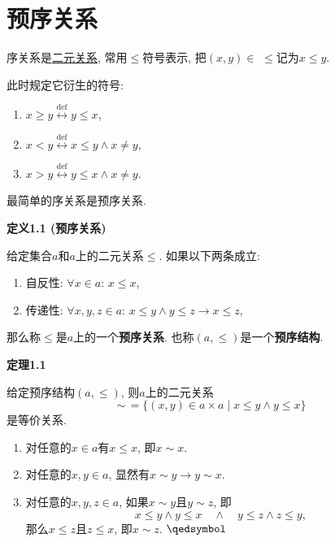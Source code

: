 \documentclass[UTF8]{ctexart}
\begin{document}
\setlength{\abovedisplayskip}{1pt}
\setlength{\belowdisplayskip}{1pt}

\section{预序关系}

序关系是\href{../../02 集合的一般构造/02 二元关系#nameddest=sec:定义1.1}{二元关系},
常用$\leqslant$符号表示, 把$(x,y)\in\,\,\leqslant$记为$x\leqslant y$.

此时规定它衍生的符号:
\begin{enumerate}
    \item $x\geqslant y\overset{\mathrm{def}}{\leftrightarrow}y\leqslant x$,
    \item $x<y\overset{\mathrm{def}}{\leftrightarrow}x\leqslant y\land x\neq y$,
    \item $x>y\overset{\mathrm{def}}{\leftrightarrow}y\leqslant x\land x\neq y$.
\end{enumerate}

\vspace{10pt}

最简单的序关系是预序关系.

\vspace{10pt}

\hypertarget{sec:定义1.1}{}
\noindent\textbf{定义1.1 (预序关系)}

给定集合$a$和$a$上的二元关系$\leqslant$. 如果以下两条成立:
\begin{enumerate}
    \item 自反性: $\forall x\in a:\,x\leqslant x$,
    \item 传递性: $\forall x,y,z\in a:\,
    x\leqslant y\land y\leqslant z\to x\leqslant z$,
\end{enumerate}
那么称$\leqslant$是$a$上的一个\textbf{预序关系}.
也称$(a,\leqslant)$是一个\textbf{预序结构}.

\vspace{10pt}

\hypertarget{sec:定理1.1}{}
\noindent\textbf{定理1.1}

给定预序结构$(a,\leqslant)$, 则$a$上的二元关系
\[
    \sim\,=\{(x,y)\in a\times a\mid x\leqslant y\land y\leqslant x\}
\]
是等价关系.


\begin{enumerate}
    \item 对任意的$x\in a$有$x\leqslant x$, 即$x\sim x$.
    \item 对任意的$x,y\in a$, 显然有$x\sim y\to y\sim x$.
    \item 对任意的$x,y,z\in a$, 如果$x\sim y$且$y\sim z$, 即
    \[
        x\leqslant y\land y\leqslant x\quad\land\quad
        y\leqslant z\land z\leqslant y,
    \]
    那么$x\leqslant z$且$z\leqslant x$, 即$x\sim z$. \hfill $\qedsymbol$
\end{enumerate}
\end{document}
